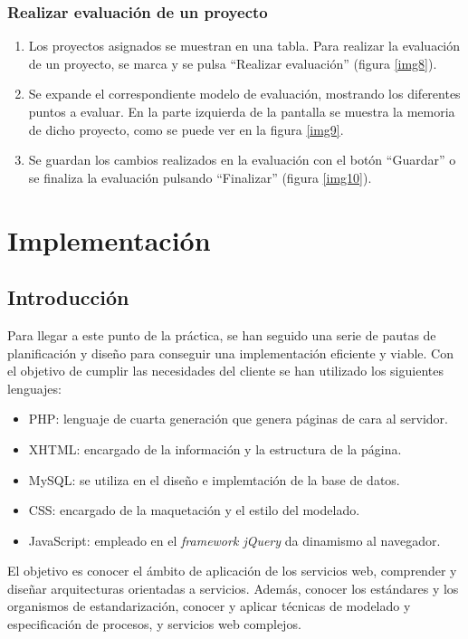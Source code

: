 \documentclass[12pt,a4paper,spanish,twoside]{book}
\begin{document}
\subsection{Realizar evaluación de un proyecto}
\begin{enumerate}
\item Los proyectos asignados se muestran en una tabla. Para realizar la 
  evaluación de un proyecto, se marca y se pulsa ``Realizar evaluación''
  (figura \ref{img8}). 


\item Se expande el correspondiente modelo de evaluación, mostrando los 
  diferentes puntos a evaluar. En la parte izquierda de la pantalla se
  muestra la memoria de dicho proyecto, como se puede ver en la figura
  \ref{img9}. 


\item Se guardan los cambios realizados en la evaluación con el botón 
  ``Guardar'' o se finaliza la evaluación pulsando ``Finalizar'' (figura 
  \ref{img10}).
  
\end{enumerate}

\chapter{Implementación}
\section{Introducción}
Para llegar a este punto de la práctica, se han seguido una serie de pautas de
planificación y diseño para conseguir una implementación eficiente y viable.
Con el objetivo de cumplir las necesidades del cliente se han utilizado los
siguientes lenguajes:
\begin{itemize}
\item PHP\cite{achour}: lenguaje de cuarta generación que genera páginas de cara
al servidor.
\item XHTML\cite{wc}: encargado de la información y la estructura de la página.
\item MySQL: se utiliza en el diseño e implemtación de la base de datos.
\item CSS\cite{wc}: encargado de la maquetación y el estilo del modelado.
\item JavaScript\cite{resig}: empleado en el \emph{framework jQuery} da 
dinamismo al navegador.
\end{itemize} 
El objetivo es conocer el ámbito de aplicación de los servicios web, comprender 
y diseñar arquitecturas orientadas a servicios. Además, conocer los estándares y
los organismos de estandarización, conocer y aplicar técnicas de modelado y 
especificación de procesos, y servicios web complejos.
\end{document}
